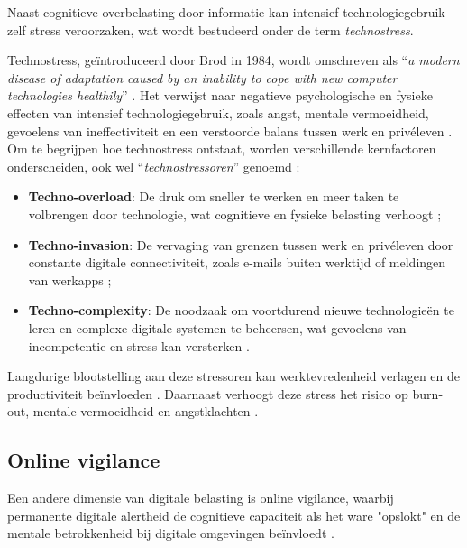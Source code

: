 Naast cognitieve overbelasting door informatie kan intensief technologiegebruik zelf stress veroorzaken, wat wordt bestudeerd onder de term \textit{technostress}.

\vspace{1em}

Technostress, geïntroduceerd door Brod in 1984, wordt omschreven als “\textit{a modern disease of adaptation caused by an inability to cope with new computer technologies healthily}” \autocite{SanjeevaKumar2024}. Het verwijst naar negatieve psychologische en fysieke effecten van intensief technologiegebruik, zoals angst, mentale vermoeidheid, gevoelens van ineffectiviteit en een verstoorde balans tussen werk en privéleven \autocite{SanjeevaKumar2024}. Om te begrijpen hoe technostress ontstaat, worden verschillende kernfactoren onderscheiden, ook wel “\textit{technostressoren}” genoemd \autocite{Consiglio2023}:

\begin{itemize}
    \item \textbf{Techno-overload}: De druk om sneller te werken en meer taken te volbrengen door technologie, wat cognitieve en fysieke belasting verhoogt \autocite{Consiglio2023};
    \item \textbf{Techno-invasion}: De vervaging van grenzen tussen werk en privéleven door constante digitale connectiviteit, zoals e-mails buiten werktijd of meldingen van werkapps \autocite{SanjeevaKumar2024};
    \item \textbf{Techno-complexity}: De noodzaak om voortdurend nieuwe technologieën te leren en complexe digitale systemen te beheersen, wat gevoelens van incompetentie en stress kan versterken \autocite{Consiglio2023}.
\end{itemize}

Langdurige blootstelling aan deze stressoren kan werktevredenheid verlagen en de productiviteit beïnvloeden \autocite{SanjeevaKumar2024}. Daarnaast verhoogt deze stress het risico op burn-out, mentale vermoeidheid en angstklachten \autocite{Consiglio2023}.

\vspace{1em}

\subsection{Online vigilance}
\label{subsec:online-vigilance}

\vspace{1em}

Een andere dimensie van digitale belasting is online vigilance, waarbij permanente digitale alertheid de cognitieve capaciteit als het ware "opslokt" en de mentale betrokkenheid bij digitale omgevingen beïnvloedt \autocite{Reinecke2018}.


